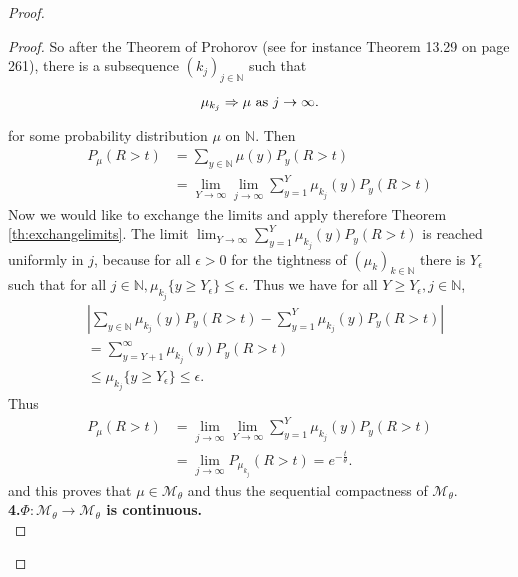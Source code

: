 \documentclass[12pt,a4paper]{scrartcl}
\numberwithin{equation}{section}
\newcommand{\N}{\mathbb{N}} %
\begin{document}
\begin{proof}
\begin{proof}
So after the Theorem of Prohorov (see for instance \cite{klenke} Theorem 13.29 on page 261),  there is a subsequence $\left(k_j\right)_{j \in \N}$ such that 

$$ \mu_{k_j} \Rightarrow \mu \textnormal{ as } j \to \infty.$$

for some probability distribution $ \mu $ on $\N$. Then
\begin{align*}
P_{\mu}\left(R > t\right) &= \sum_{y \in \N} \mu\left(y\right) P_y\left(R > t\right) \\
&= \lim_{Y \to \infty} \lim_{j \to \infty} \sum_{y=1}^{Y} \mu_{k_j}\left(y\right) P_y\left(R > t\right)
\end{align*}
Now we would like to exchange the limits and apply therefore Theorem \ref{th:exchangelimits}. The limit $\lim_{Y \to \infty} \sum_{y=1}^Y \mu_{k_j}\left(y\right) P_y\left(R > t\right)$ is reached uniformly in $j$, because for all $\epsilon > 0$ for the tightness of $\left(\mu_k\right)_{k \in \N}$ there is $Y_{\epsilon}$ such that for all $ j \in \N, \mu_{k_j}\lbrace y \geq Y_{\epsilon} \rbrace  \leq \epsilon. $ Thus we have for all $Y \geq Y_{\epsilon}, j \in \N$,
\begin{equation} \label{eq:weshowlimitexchange}
\begin{aligned}
&\left|\sum_{y \in \N} \mu_{k_j}\left(y\right) P_y\left(R > t\right) - \sum_{y=1}^{Y} \mu_{k_j}\left(y\right) P_y\left(R > t\right) \right| \\
&=\sum_{y=Y+1}^{\infty} \mu_{k_j}\left(y\right) P_y\left(R > t\right) \\
&\leq \mu_{k_j}\lbrace y \geq Y_{\epsilon} \rbrace  \leq \epsilon.
\end{aligned} 
\end{equation}
Thus
\begin{align*}
P_{\mu}\left(R > t\right) &= \lim_{j \to \infty} \lim_{Y \to \infty} \sum_{y=1}^{Y} \mu_{k_j}\left(y\right) P_y\left(R > t\right) \\
&= \lim_{j \to \infty} P_{\mu_{k_j}}\left(R > t\right) = e^{-\frac{t}{\theta}}.
\end{align*}
and this proves that $\mu \in \mathcal{M}_{\theta}$ and thus the sequential compactness of $\mathcal{M}_{\theta}$. \\[2ex]


\textbf{4.$\Phi:\mathcal{M}_{\theta} \to \mathcal{M}_{\theta}$ is continuous.}\\



\end{proof}
\end{proof}
\end{document}
